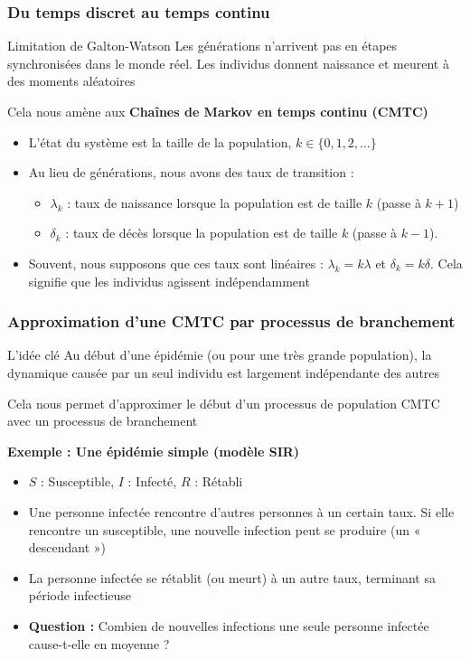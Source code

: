 \documentclass[aspectratio=169]{beamer}\usepackage[]{graphicx}\usepackage[]{xcolor}
\begin{document}
\begin{frame}
    \frametitle{Du temps discret au temps continu}

    \begin{block}{Limitation de Galton-Watson}
        Les générations n'arrivent pas en étapes synchronisées dans le monde réel. Les individus donnent naissance et meurent à des moments aléatoires
    \end{block}

    Cela nous amène aux \textbf{Chaînes de Markov en temps continu (CMTC)}

    \begin{itemize}
        \item L'état du système est la taille de la population, $k \in \{0, 1, 2, \dots\}$
        \item Au lieu de générations, nous avons des taux de transition :
            \begin{itemize}
                \item $\lambda_k$ : taux de naissance lorsque la population est de taille $k$ (passe à $k+1$)
                \item $\delta_k$ : taux de décès lorsque la population est de taille $k$ (passe à $k-1$).
            \end{itemize}
        \item Souvent, nous supposons que ces taux sont linéaires : $\lambda_k = k\lambda$ et $\delta_k = k\delta$. Cela signifie que les individus agissent indépendamment
    \end{itemize}
\end{frame}

\begin{frame}
    \frametitle{Approximation d'une CMTC par processus de branchement}

    \begin{alertblock}{L'idée clé}
    Au début d'une épidémie (ou pour une très grande population), la dynamique causée par un seul individu est largement indépendante des autres
    \end{alertblock}

    Cela nous permet d'approximer le début d'un processus de population CMTC avec un processus de branchement

    \textbf{Exemple : Une épidémie simple (modèle SIR)}
    \begin{itemize}
        \item $S$ : Susceptible, $I$ : Infecté, $R$ : Rétabli
        \item Une personne infectée rencontre d'autres personnes à un certain taux. Si elle rencontre un susceptible, une nouvelle infection peut se produire (un « descendant »)
        \item La personne infectée se rétablit (ou meurt) à un autre taux, terminant sa période infectieuse
        \item \textbf{Question :} Combien de nouvelles infections une seule personne infectée cause-t-elle en moyenne ?
    \end{itemize}
\end{frame}
\end{document}
